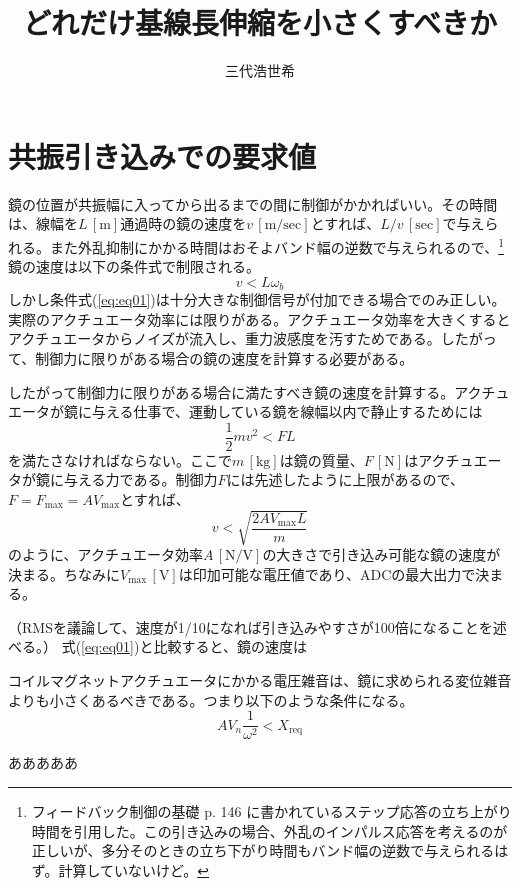 \documentclass[a4paper,12pt]{jsarticle}
\title{どれだけ基線長伸縮を小さくすべきか}
\author{三代浩世希}
\begin{document}
\setcounter{tocdepth}{2}
\maketitle
\abstract{
}
\tableofcontents

\section{共振引き込みでの要求値}
鏡の位置が共振幅に入ってから出るまでの間に制御がかかればいい。その時間は、線幅を$L\,\mathrm{[m]}$通過時の鏡の速度を$v\, \mathrm{[m/sec]}$とすれば、$L/v\, \mathrm{[sec]}$で与えられる。また外乱抑制にかかる時間はおそよバンド幅の逆数で与えられるので、\footnote[1]{フィードバック制御の基礎 p. 146 に書かれているステップ応答の立ち上がり時間を引用した。この引き込みの場合、外乱のインパルス応答を考えるのが正しいが、多分そのときの立ち下がり時間もバンド幅の逆数で与えられるはず。計算していないけど。}鏡の速度は以下の条件式で制限される。
\begin{equation} \label{eq:eq01}
v < L \omega_{b}
\end{equation}
しかし条件式(\ref{eq:eq01})は十分大きな制御信号が付加できる場合でのみ正しい。実際のアクチュエータ効率には限りがある。アクチュエータ効率を大きくするとアクチュエータからノイズが流入し、重力波感度を汚すためである。したがって、制御力に限りがある場合の鏡の速度を計算する必要がある。

したがって制御力に限りがある場合に満たすべき鏡の速度を計算する。アクチュエータが鏡に与える仕事で、運動している鏡を線幅以内で静止するためには
\begin{equation} \label{eq:eq02}
\frac{1}{2}mv^2 < F L
\end{equation}
を満たさなければならない。ここで$m\,\mathrm{[kg]}$は鏡の質量、$F\,\mathrm{[N]}$はアクチュエータが鏡に与える力である。制御力$F$には先述したように上限があるので、$F=F_{\mathrm{max}}=AV_{\mathrm{max}}$とすれば、
\begin{equation} \label{eq:eq03}
v < \sqrt{\frac{2AV_{\mathrm{max}}L}{m}}
\end{equation}
のように、アクチュエータ効率$A\,\mathrm{[N/V]}$の大きさで引き込み可能な鏡の速度が決まる。ちなみに$V_{\mathrm{max}}\,\mathrm{[V]}$は印加可能な電圧値であり、ADCの最大出力で決まる。

（RMSを議論して、速度が1/10になれば引き込みやすさが100倍になることを述べる。）
式(\ref{eq:eq01})と比較すると、鏡の速度は


コイルマグネットアクチュエータにかかる電圧雑音は、鏡に求められる変位雑音よりも小さくあるべきである。つまり以下のような条件になる。
\begin{equation} \label{eq:eq04}
  A V_n  \frac{1}{\omega^2} < X_{\mathrm{req}}
\end{equation}

あああああ
\end{document}
